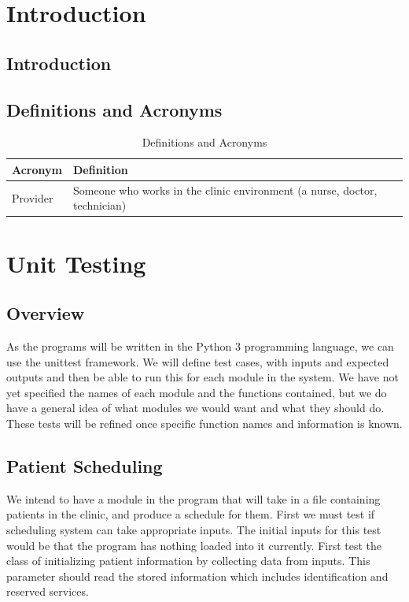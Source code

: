 \documentclass[12pt]{article}
\begin{document}
\section{Introduction}

\subsection{Introduction}

\subsection{Definitions and Acronyms} 
\begin{center}
\begin{longtable}{>{\raggedright\arraybackslash}p{}>{\raggedright\arraybackslash}p{}}
\caption{Definitions and Acronyms}\label{Table_Acronyms}\\
\toprule

\bf Acronym & \bf Definition\\\midrule
Provider & Someone who works in the clinic environment (a nurse, doctor, technician)\\\midrule

\bottomrule
\end{longtable}
\end{center}

\section{Unit Testing}
\subsection{Overview}
	As the programs will be written in the Python 3 programming language, we can use the unittest framework. We will define test cases, with inputs and expected outputs and then be able to run this for each module in the system. We have not yet specified the names of each module and the functions contained, but we do have a general idea of what modules we would want and what they should do. These tests will be refined once specific function names and information is known.

\subsection{Patient Scheduling} 
	We intend to have a module in the program that will take in a file containing patients in the clinic, and produce a schedule for them. First we must test if scheduling system can take appropriate inputs. The initial inputs for this test would be that the program has nothing loaded into it currently. First test the class of initializing patient information by collecting data from inputs. This parameter should read the stored information which includes identification and reserved services.
\end{document}
